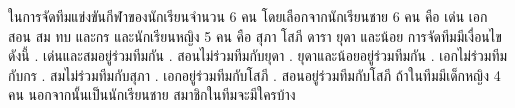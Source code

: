 ﻿%
\question ในการจัดทีมแข่งขันกีฬาของนักเรียนจำนวน 6 คน
โดยเลือกจากนักเรียนชาย 6 คน คือ เด่น เอก สอน สม ทบ และกร
และนักเรียนหญิง 5 คน คือ สุภา โสภี ดารา ยุดา และน้อย
การจัดทีมมีเงื่อนไขดังนี้ . เด่นและสมอยู่ร่วมทีมกัน . สอนไม่ร่วมทีมกับยุดา . ยุดาและน้อยอยู่ร่วมทีมกัน . เอกไม่ร่วมทีมกับกร . สมไม่ร่วมทีมกับสุภา . เอกอยู่ร่วมทีมกับโสภี . สอนอยู่ร่วมทีมกับโสภี \newline
ถ้าในทีมมีเด็กหญิง 4 คน นอกจากนั้นเป็นนักเรียนชาย สมาชิกในทีมจะมีใครบ้าง
\newline
{}
